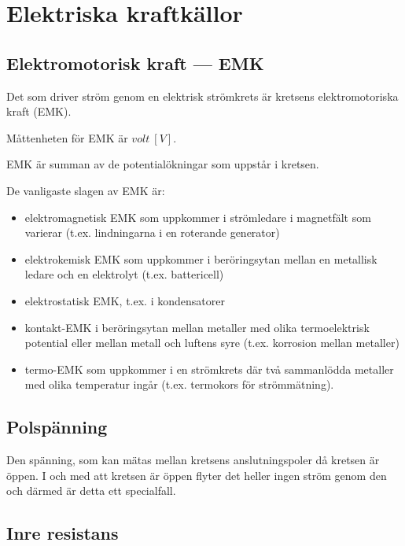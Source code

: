 \section{Elektriska kraftkällor}

\subsection{Elektromotorisk kraft --- EMK}

Det som driver ström genom en elektrisk strömkrets är kretsens elektromotoriska
kraft (EMK).

Måttenheten för EMK är \(volt\ [V]\).

EMK är summan av de potentialökningar som uppstår i kretsen.

De vanligaste slagen av EMK är:

\begin{itemize}
\item elektromagnetisk EMK som uppkommer i strömledare i magnetfält som
varierar (t.ex. lindningarna i en roterande generator)
\item elektrokemisk EMK som uppkommer i beröringsytan mellan en metallisk
ledare och en elektrolyt (t.ex. battericell)
\item elektrostatisk EMK, t.ex. i kondensatorer
\item kontakt-EMK i beröringsytan mellan metaller med olika termoelektrisk
potential eller mellan metall och luftens syre (t.ex. korrosion mellan metaller)
\item termo-EMK som uppkommer i en strömkrets där två sammanlödda metaller med
olika temperatur ingår (t.ex. termokors för strömmätning).
\end{itemize}

\subsection{Polspänning}

Den spänning, som kan mätas mellan kretsens anslutningspoler då kretsen är öppen. 
I och med att kretsen är öppen flyter det heller ingen ström genom den och därmed 
är detta ett specialfall.

\subsection{Inre resistans}

